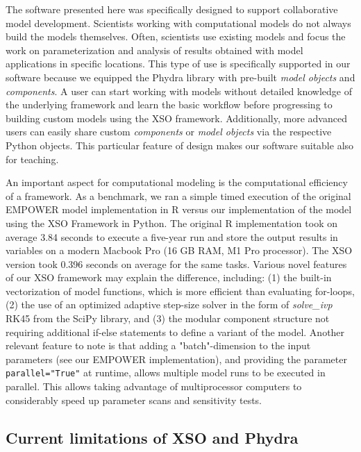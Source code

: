 \documentclass[gmd, manuscript]{copernicus}
\begin{document}
The software presented here was specifically designed to support collaborative model development. Scientists working with computational models do not always build the models themselves. Often, scientists use existing models and focus the work on parameterization and analysis of results obtained with model applications in specific locations. This type of use is specifically supported in our software because we equipped the Phydra library with pre-built \textit{model objects} and \textit{components}. A user can start working with models without detailed knowledge of the underlying framework and learn the basic workflow before progressing to building custom models using the XSO framework. Additionally, more advanced users can easily share custom \textit{components} or \textit{model objects} via the respective Python objects. This particular feature of design makes our software suitable also for teaching. 

An important aspect for computational modeling is the computational efficiency of a framework. As a benchmark, we ran a simple timed execution of the original EMPOWER model implementation in R versus our implementation of the model using the XSO Framework in Python. The original R implementation took on average 3.84 seconds to execute a five-year run and store the output results in variables on a modern Macbook Pro (16 GB RAM, M1 Pro processor). The XSO version took 0.396 seconds on average for the same tasks. 
Various novel features of our XSO framework may explain the difference, including: 
(1) the built-in vectorization of model functions, which is more efficient than evaluating for-loops, 
(2) the use of an optimized adaptive step-size solver in the form of \textit{solve\_ivp} RK45 from the SciPy library, and 
(3) the modular component structure not requiring additional if-else statements to define a variant of the model.
Another relevant feature to note is that adding a "batch"-dimension to the input parameters (see our EMPOWER implementation), and providing the parameter \texttt{parallel="True"} at runtime, allows multiple model runs to be executed in parallel. This allows taking advantage of multiprocessor computers to considerably speed up parameter scans and sensitivity tests. 

\subsection{Current limitations of XSO and Phydra}
\end{document}
